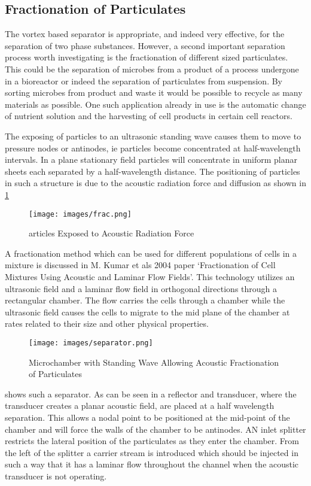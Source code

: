 \documentclass[12pt]{article}
\begin{document}
\subsection{Fractionation of Particulates}

The vortex based separator is appropriate, and indeed very effective, for the separation of two phase substances. However, a second important separation process worth investigating is the fractionation of different sized particulates. This could be the separation of microbes from a product of a process undergone in a bioreactor or indeed the separation of particulates from suspension. By sorting microbes from product and waste it would be possible to recycle as many materials as possible. One such application already in use is the automatic change of nutrient solution and the harvesting of cell products in certain cell reactors. 

The exposing of particles to an ultrasonic standing wave causes them to move to pressure nodes or antinodes, ie particles become concentrated at half-wavelength intervals. In a plane stationary field particles will concentrate in uniform planar sheets each separated by a half-wavelength distance. The positioning of particles in such a structure is due to the acoustic radiation force and diffusion as shown in \cref{fig:acoust}

\begin{figure}[ht]
\centering
\texttt{[image: images/frac.png]}
\caption{articles Exposed to Acoustic Radiation Force}
\label{fig:acoust}
\end{figure}

A fractionation method which can be used for different populations of cells in a mixture is discussed in M. Kumar et als 2004 paper ‘Fractionation of Cell Mixtures Using Acoustic and Laminar Flow Fields’.\cite{kumar2005fractionation} This technology utilizes an ultrasonic field and a laminar flow field in orthogonal directions through a rectangular chamber. The flow carries the cells through a chamber while the ultrasonic field causes the cells to migrate to the mid plane of the chamber at rates related to their size and other physical properties. 

\begin{figure}[ht]
\centering
\texttt{[image: images/separator.png]}
\caption{Microchamber with Standing Wave Allowing Acoustic Fractionation of Particulates}
\label{fig:separator}
\end{figure}

 shows such a separator. As can be seen in a reflector and transducer, where the transducer creates a planar acoustic field, are placed at a half wavelength separation. This allows a nodal point to be positioned at the mid-point of the chamber and will force the walls of the chamber to be antinodes. AN inlet splitter restricts the lateral position of the particulates as they enter the chamber. From the left of the splitter a carrier stream is introduced which should be injected in such a way that it has a laminar flow throughout the channel when the acoustic transducer is not operating. 
\end{document}

